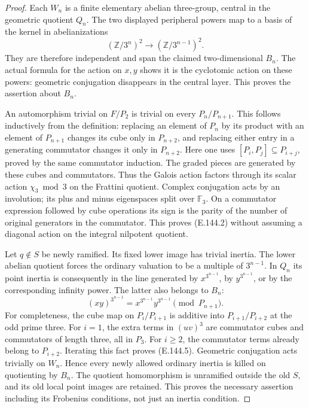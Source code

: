 \begin{proof}
Each \(W_n\) is a finite elementary abelian
three-group, central in the geometric quotient
\(Q_n\). The two displayed peripheral powers
map to a basis of the kernel in abelianizations
\[
 (\mathbb Z/3^n)^2\longrightarrow
                         (\mathbb Z/3^{n-1})^2 .
 \]
They are therefore independent and span the
claimed two-dimensional \(B_n\).
The actual formula for the action on \(x,y\)
shows it is the cyclotomic action on these
powers: geometric conjugation disappears in
the central layer. This proves the assertion
about \(B_n\).

An automorphism trivial on \(F/P_2\) is trivial
on every \(P_n/P_{n+1}\).
This follows inductively from the definition:
replacing an element of \(P_n\) by its product
with an element of \(P_{n+1}\) changes its cube
only in \(P_{n+2}\), and replacing either entry
in a generating commutator changes it only
in \(P_{n+2}\). Here one uses
\([P_i,P_j]\subseteq P_{i+j}\), proved by the
same commutator induction.
The graded pieces are generated by these
cubes and commutators.
Thus the Galois action factors through its
scalar action \(\chi_3\bmod3\) on the Frattini
quotient. Complex conjugation acts by an
involution; its plus and minus eigenspaces
split over \(\mathbb F_3\).
On a commutator expression followed by cube
operations its sign is the parity of the
number of original generators in the
commutator. This proves (E.144.2) without
assuming a diagonal action on the integral
nilpotent quotient.

Let \(q\notin S\) be newly ramified.
Its fixed lower image has trivial inertia.
The lower abelian quotient forces the
ordinary valuation to be a multiple of
\(3^{n-1}\). In \(Q_n\) its point inertia
is consequently in the line generated by
\(x^{3^{n-1}}\), by \(y^{3^{n-1}}\), or by
the corresponding infinity power.
The latter also belongs to \(B_n\):
\[
 (xy)^{3^{n-1}}
       =x^{3^{n-1}}y^{3^{n-1}}
                                      \pmod{P_{n+1}}.
 \tag{E.144.5}
\]
For completeness, the cube map on
\(P_i/P_{i+1}\) is additive into
\(P_{i+1}/P_{i+2}\) at the odd prime three.
For \(i=1\), the extra terms in \((uv)^3\)
are commutator cubes and commutators of
length three, all in \(P_3\).
For \(i\ge2\), the commutator terms already
belong to \(P_{i+2}\).
Iterating this fact proves (E.144.5).
Geometric conjugation acts trivially on
\(W_n\). Hence every newly allowed ordinary
inertia is killed on quotienting by \(B_n\).
The quotient homomorphism is unramified
outside the old \(S\), and its old local
point images are retained. This proves
the necessary assertion including its
Frobenius conditions, not just an inertia
condition.


\end{proof}
